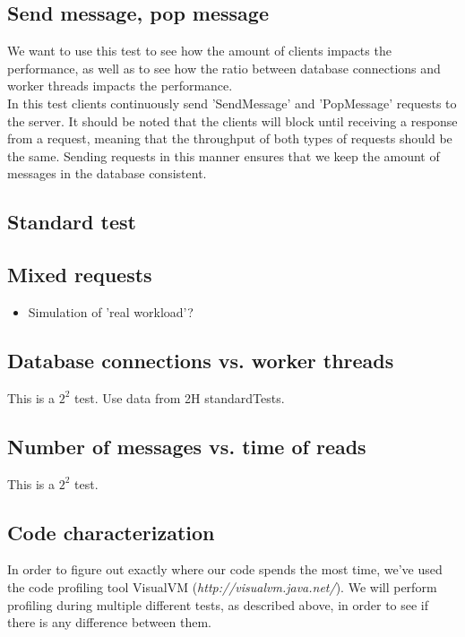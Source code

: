 \documentclass{article}
\begin{document}
        \subsection{Send message, pop message}
            We want to use this test to see how the amount of clients impacts the performance, as well as to see how the ratio between database connections and worker threads impacts the performance.\\
            In this test clients continuously send 'SendMessage' and 'PopMessage' requests to the server. It should be noted that the clients will block until receiving a response from a request, meaning that the throughput of both types of requests should be the same. Sending requests in this manner ensures that we keep the amount of messages in the database consistent.

        \subsection{Standard test}

        \subsection{Mixed requests}
            \begin{itemize}
                \item Simulation of 'real workload'?
            \end{itemize}

        \subsection{Database connections vs. worker threads}
            This is a $2^2$ test. Use data from 2H standardTests.

        \subsection{Number of messages vs. time of reads}
            This is a $2^2$ test.

        \subsection{Code characterization}
            In order to figure out exactly where our code spends the most time, we've used the code profiling tool VisualVM (\textit{http://visualvm.java.net/}). We will perform profiling during multiple different tests, as described above, in order to see if there is any difference between them.
\end{document}
